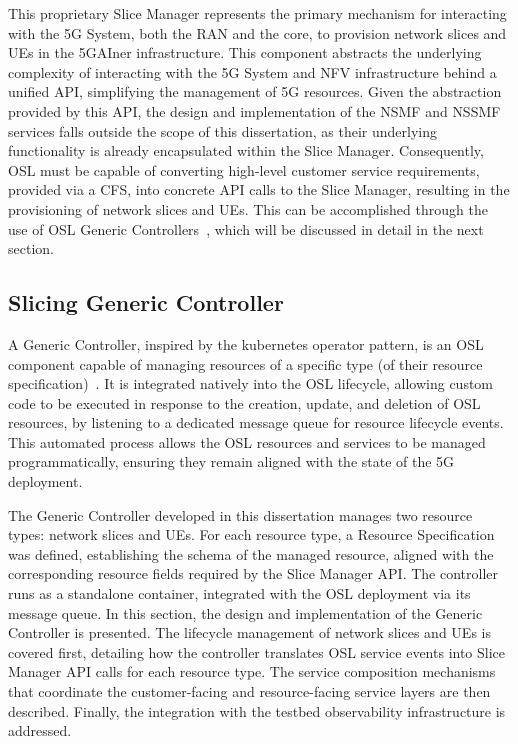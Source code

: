 This proprietary Slice Manager represents the primary mechanism for interacting with the \acs{5G} System, both the \acs{RAN} and the core, to provision network slices and \acsp{UE} in the 5GAIner infrastructure. This component abstracts the underlying complexity of interacting with the \acs{5G} System and \acs{NFV} infrastructure behind a unified \acs{API}, simplifying the management of \acs{5G} resources. Given the abstraction provided by this \acs{API}, the design and implementation of the \acs{NSMF} and \acs{NSSMF} services falls outside the scope of this dissertation, as their underlying functionality is already encapsulated within the Slice Manager. Consequently, \acs{OSL} must be capable of converting high-level customer service requirements, provided via a \acs{CFS}, into concrete \acs{API} calls to the Slice Manager, resulting in the provisioning of network slices and \acsp{UE}. This can be accomplished through the use of \acs{OSL} Generic Controllers~\cite{OpenSliceGenericServicesController}, which will be discussed in detail in the next section.

\subsection{Slicing Generic Controller}

A Generic Controller, inspired by the kubernetes operator pattern, is an \acs{OSL} component capable of managing resources of a specific type (of their resource specification)~\cite{OpenSliceGenericServicesController}. It is integrated natively into the OSL lifecycle, allowing custom code to be executed in response to the creation, update, and deletion of \acs{OSL} resources, by listening to a dedicated message queue for resource lifecycle events. This automated process allows the \acs{OSL} resources and services to be managed programmatically, ensuring they remain aligned with the state of the \acs{5G} deployment.

The Generic Controller developed in this dissertation manages two resource types: network slices and \acsp{UE}. For each resource type, a Resource Specification was defined, establishing the schema of the managed resource, aligned with the corresponding resource fields required by the Slice Manager \acs{API}. The controller runs as a standalone container, integrated with the \acs{OSL} deployment via its message queue. In this section, the design and implementation of the Generic Controller is presented. The lifecycle management of network slices and \acsp{UE} is covered first, detailing how the controller translates \acs{OSL} service events into Slice Manager \acs{API} calls for each resource type. The service composition mechanisms that coordinate the customer-facing and resource-facing service layers are then described. Finally, the integration with the testbed observability infrastructure is addressed.

